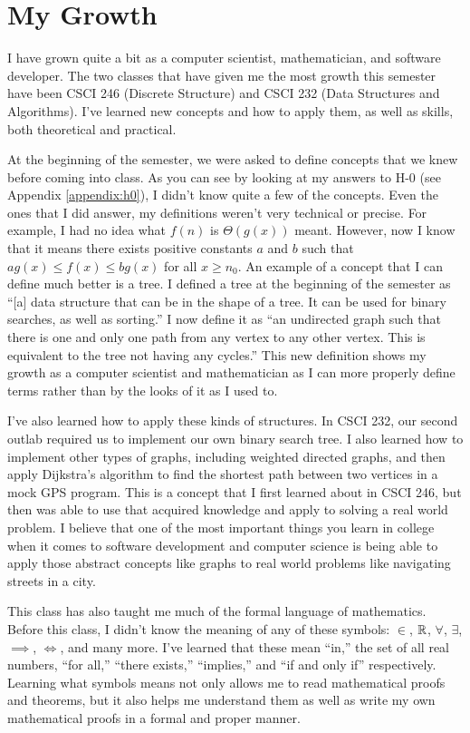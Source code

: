 \documentclass{article}
\begin{document}
\section{My Growth}
\begin{doublespace}
\qquad I have grown quite a bit as a computer scientist, mathematician, and software developer. The two 
classes that have given me the most growth this semester have been CSCI 246 (Discrete Structure) and CSCI 232 (Data Structures and Algorithms). I've learned new
concepts and how to apply them, as well as skills, both theoretical and practical.

\qquad At the beginning of the semester, we were asked to define concepts that we knew before coming into class.
As you can see by looking at my answers to H-0 (see Appendix \ref{appendix:h0}), I didn't know quite a few of the concepts. Even the ones 
that I did answer, my definitions weren't very technical or precise. For example, I had no idea what $f(n)$ is $\Theta(g(x))$ meant.
However, now I know that it means there exists positive constants $a$ and $b$ such that $ag(x) \leq f(x) \leq bg(x)$ for all $x \geq n_0$.
An example of a concept that I can define much better is a tree. I defined a tree at the beginning of the semester as ``[a] data structure that can be in the shape of a tree. It can be used for binary searches, as well as sorting.''
I now define it as ``an undirected graph such that there is one and only one path from any vertex to any other vertex. This is equivalent to the tree not having any cycles.'' This new definition shows my growth as a computer scientist and mathematician as I can more properly define terms rather than by the looks of it as I used to.

\qquad I've also learned how to apply these kinds of structures. In CSCI 232, our second outlab required us to implement our own binary search tree. I also learned how to implement other types of graphs, including weighted directed graphs, and then apply Dijkstra's algorithm to find the shortest path between two vertices in a mock GPS program. This is a concept that I first learned about in CSCI 246, but then was able to use that acquired knowledge and apply to solving a real world problem. I believe that one of the most important things you learn in college when it comes to software development and computer science is being able to apply those abstract concepts like graphs to real world problems like navigating streets in a city.

\qquad This class has also taught me much of the formal language of mathematics. Before this class, I didn't know the meaning of any of these symbols: $\in$, ${\mathbb R}$, $\forall$, $\exists$, $\implies$, $\iff$, and many more. I've learned that these mean ``in,'' the set of all real numbers, ``for all,'' ``there exists,'' ``implies,'' and ``if and only if'' respectively. Learning what symbols means not only allows me to read mathematical proofs and theorems, but it also helps me understand them as well as write my own mathematical proofs in a formal and proper manner.


\end{doublespace}
\end{document}
